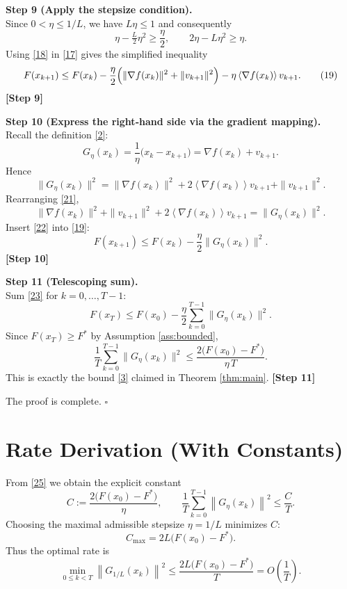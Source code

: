 \documentclass{article}
\newcommand{\grad}{\nabla}
\newcommand{\norm}[1]{\left\|#1\right\|}
\newcommand{\inner}[1]{\left\langle#1\right\rangle}
\begin{document}
\noindent\textbf{Step 9 (Apply the stepsize condition).}\\
Since $0<\eta\le 1/L$, we have $L\eta\le1$ and consequently
\[
\eta-\tfrac{L}{2}\eta^{2}\ge \frac{\eta}{2},\qquad
2\eta-L\eta^{2}\ge \eta .
\tag{18}
\]
Using \eqref{18} in \eqref{17} gives the simplified inequality
\[
F(x_{k+1})\le F(x_{k})-\frac{\eta}{2}\Bigl(\|\grad f(x_{k})\|^{2}+ \|v_{k+1}\|^{2}\Bigr)
-\eta\inner{\grad f(x_{k})}{v_{k+1}} .
\tag{19}
\]
\textbf{[Step 9]}

\noindent\textbf{Step 10 (Express the right‑hand side via the gradient mapping).}\\
Recall the definition \eqref{2}:
\[
G_{\eta}(x_{k})=\frac{1}{\eta}\bigl(x_{k}-x_{k+1}\bigr)
= \grad f(x_{k})+v_{k+1}.
\tag{20}
\]
Hence
\[
\|G_{\eta}(x_{k})\|^{2}= \|\grad f(x_{k})\|^{2}+2\inner{\grad f(x_{k})}{v_{k+1}}+\|v_{k+1}\|^{2}.
\tag{21}
\]
Rearranging \eqref{21},
\[
\|\grad f(x_{k})\|^{2}+ \|v_{k+1}\|^{2}+2\inner{\grad f(x_{k})}{v_{k+1}}
= \|G_{\eta}(x_{k})\|^{2}.
\tag{22}
\]
Insert \eqref{22} into \eqref{19}:
\[
F(x_{k+1})\le F(x_{k})-\frac{\eta}{2}\|G_{\eta}(x_{k})\|^{2}.
\tag{23}
\]
\textbf{[Step 10]}

\noindent\textbf{Step 11 (Telescoping sum).}\\
Sum \eqref{23} for $k=0,\dots,T-1$:
\[
F(x_{T})\le F(x_{0})-\frac{\eta}{2}\sum_{k=0}^{T-1}\|G_{\eta}(x_{k})\|^{2}.
\tag{24}
\]
Since $F(x_{T})\ge F^{*}$ by Assumption \ref{ass:bounded},
\[
\frac{1}{T}\sum_{k=0}^{T-1}\|G_{\eta}(x_{k})\|^{2}
\le \frac{2\bigl(F(x_{0})-F^{*}\bigr)}{\eta\,T}.
\tag{25}
\]
This is exactly the bound \eqref{3} claimed in Theorem \ref{thm:main}.
\textbf{[Step 11]}

The proof is complete. \hfill $\square$

\section*{Rate Derivation (With Constants)}
From \eqref{25} we obtain the explicit constant
\[
C:=\frac{2\bigl(F(x_{0})-F^{*}\bigr)}{\eta},
\qquad
\frac{1}{T}\sum_{k=0}^{T-1}\norm{G_{\eta}(x_{k})}^{2}\le\frac{C}{T}.
\]
Choosing the maximal admissible stepsize $\eta=1/L$ minimizes $C$:
\[
C_{\max}=2L\bigl(F(x_{0})-F^{*}\bigr).
\]
Thus the optimal rate is
\[
\min_{0\le k<T}\norm{G_{1/L}(x_{k})}^{2}
\le \frac{2L\bigl(F(x_{0})-F^{*}\bigr)}{T}=O\!\left(\frac{1}{T}\right).
\]
\end{document}
